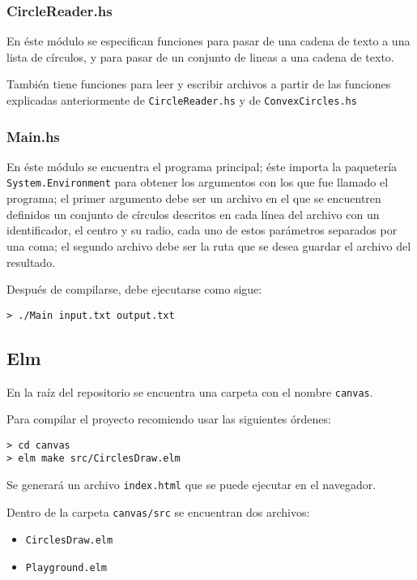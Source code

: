 \documentclass[12pt]{article}
\begin{document}
\subsubsection*{CircleReader.hs}

\noindent En éste módulo se especifican funciones para pasar de una cadena de texto a una lista de círculos, y para pasar de un conjunto de lineas a una cadena de texto.

También tiene funciones para leer y escribir archivos a partir de las funciones explicadas anteriormente de \texttt{CircleReader.hs} y de \texttt{ConvexCircles.hs}

\subsubsection*{Main.hs}

\noindent En éste módulo se encuentra el programa principal; éste importa la paquetería \texttt{System.Environment} para obtener los argumentos con los que fue llamado el programa; el primer argumento debe ser un archivo en el que se encuentren definidos un conjunto de círculos descritos en cada línea del archivo con un identificador, el centro y su radio, cada uno de estos parámetros separados por una coma; el segundo archivo debe ser la ruta que se desea guardar el archivo del resultado.

Después de compilarse, debe ejecutarse como sigue:

\begin{verbatim}
> ./Main input.txt output.txt
\end{verbatim}

\subsection*{Elm}

\noindent En la raíz del repositorio se encuentra una carpeta con el nombre \texttt{canvas}.

Para compilar el proyecto recomiendo usar las siguientes órdenes:

\begin{verbatim}
> cd canvas
> elm make src/CirclesDraw.elm
\end{verbatim}

Se generará un archivo \texttt{index.html} que se puede ejecutar en el navegador.

Dentro de la carpeta \texttt{canvas/src} se encuentran dos archivos:

\begin{itemize}
\item \texttt{CirclesDraw.elm}
\item \texttt{Playground.elm}
\end{itemize}
\end{document}
